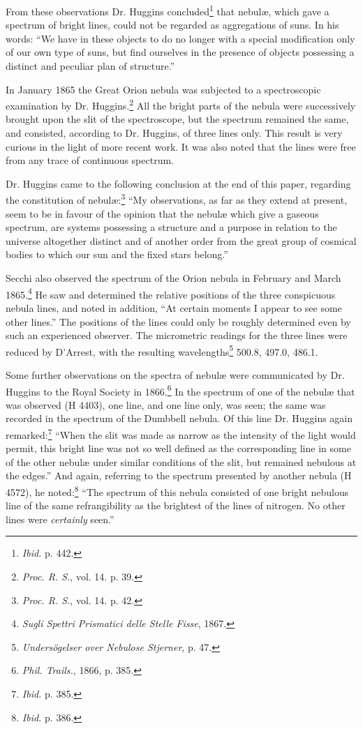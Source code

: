 \documentclass[a4paper, 12pt, oneside, polutonikogreek, english]{article}
\begin{document}
From these observations Dr. Huggins concluded\footnote{\emph{Ibid.} p. 442.} that nebulæ, which gave a spectrum of bright lines, could not be regarded as aggregations of suns. In his words: ``We have in these objects to do no longer with a special modification only of our own type of suns, but find ourselves in the presence of objects possessing a distinct and peculiar plan of structure.''

In January 1865 the Great Orion nebula was subjected to a spectroscopic examination by Dr. Huggins.\footnote{\emph{Proc. R. S.}, vol. 14. p. 39.} All the bright parts of the nebula were successively brought upon the slit of the spectroscope, but the spectrum remained the same, and consisted, according to Dr. Huggins, of three lines only. This result is very curious in the light of more recent work. It was also noted that the lines were free from any trace of continuous spectrum.

Dr. Huggins came to the following conclusion at the end of this paper, regarding the constitution of nebulæ:\footnote{\emph{Proc. R. S.}, vol. 14. p. 42.} ``My observations, as far as they extend at present, seem to be in favour of the opinion that the nebulæ which give a gaseous spectrum, are systems possessing a structure and a purpose in relation to the universe altogether distinct and of another order from the great group of cosmical bodies to which our sun and the fixed stars belong.''

Secchi also observed the spectrum of the Orion nebula in February and March 1865.\footnote{\emph{Sugli Spettri Prismatici delle Stelle Fisse}, 1867.} He saw and determined the relative positions of the three conspicuous nebula lines, and noted in addition, ``At certain moments I appear to see some other lines.'' The positions of the lines could only be roughly determined even by such an experienced observer. The micrometric readings for the three lines were reduced by D'Arrest, with the resulting wavelengths\footnote{\emph{Undersögelser over Nebulose Stjerner}, p. 47.} 500.8, 497.0, 486.1.

Some further observations on the spectra of nebulæ were communicated by Dr. Huggins to the Royal Society in 1866.\footnote{\emph{Phil. Trails.}, 1866, p. 385.} In the spectrum of one of the nebulæ that was observed (H 4403), one line, and one line only, was seen; the same was recorded in the spectrum of the Dumbbell nebula. Of this line Dr. Huggins again remarked:\footnote{\emph{Ibid.} p. 385.} ``When the slit was made as narrow as the intensity of the light would permit, this bright line was not so well defined as the corresponding line in some of the other nebulæ under similar conditions of the slit, but remained nebulous at the edges.'' And again, referring to the spectrum presented by another nebula (H 4572), he noted:\footnote{\emph{Ibid.} p. 386.} ``The spectrum of this nebula consisted of one bright nebulous line of the same refrangibility as the brightest of the lines of nitrogen. No other lines were \emph{certainly} seen.''
\end{document}
